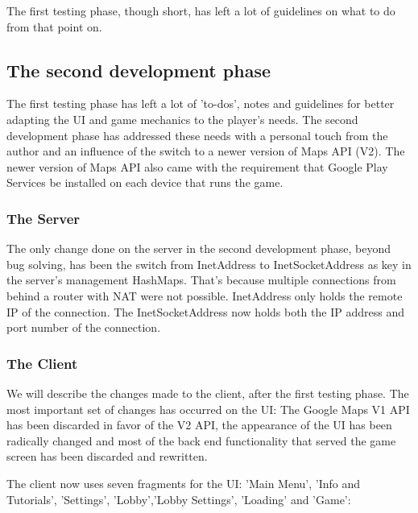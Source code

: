 The first testing phase, though short, has left a lot of guidelines on what to
do from that point on.\newline

\subsection{The second development phase}

The first testing phase has left a lot of 'to-dos', notes and guidelines for
better adapting the UI and game mechanics to the player's needs. The second
development phase has addressed these needs with a personal touch from the
author and an influence of the switch to a newer version of Maps API (V2). The
newer version of Maps API also came with the requirement that Google Play
Services be installed on each device that runs the game.

\subsubsection{The Server}

The only change done on the server in the second development phase, beyond bug
solving, has been the switch from InetAddress to InetSocketAddress as key in the
server's management HashMaps. That's because multiple connections from behind a
router with NAT were not possible. InetAddress only holds the remote IP of the
connection. The InetSocketAddress now holds both the IP address and port number
of the connection.

\subsubsection{The Client}

We will describe the changes made to the client, after the first testing phase.
The most important set of changes has occurred on the UI: The Google Maps V1 API
has been discarded in favor of the V2 API, the appearance of the UI has been
radically changed and most of the back end functionality that served the game
screen has been discarded and rewritten.

The client now uses seven fragments for the UI: 'Main Menu', 'Info and
Tutorials', 'Settings', 'Lobby','Lobby Settings', 'Loading' and 'Game':

